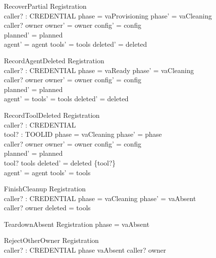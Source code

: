\documentclass[a4paper,10pt,fleqn]{article}
\begin{document}
\begin{schema}{RecoverPartial}
  \Delta Registration \\
  caller? : CREDENTIAL
\where
  phase = vaProvisioning \land phase' = vaCleaning \\
  caller? \in owner \land owner' = owner \land config' = config \\
  planned' = planned \\
  agent' = agent \land tools' = tools \land deleted' = deleted
\end{schema}

\begin{schema}{RecordAgentDeleted}
  \Delta Registration \\
  caller? : CREDENTIAL
\where
  phase = vaReady \land phase' = vaCleaning \\
  caller? \in owner \land owner' = owner \land config' = config \\
  planned' = planned \\
  agent' = \emptyset \land tools' = tools \land deleted' = deleted
\end{schema}

\begin{schema}{RecordToolDeleted}
  \Delta Registration \\
  caller? : CREDENTIAL \\
  tool? : TOOLID
\where
  phase = vaCleaning \land phase' = phase \\
  caller? \in owner \land owner' = owner \land config' = config \\
  planned' = planned \\
  tool? \in \ran tools \land deleted' = deleted \cup \{tool?\} \\
  agent' = agent \land tools' = tools
\end{schema}

\begin{schema}{FinishCleanup}
  \Delta Registration \\
  caller? : CREDENTIAL
\where
  phase = vaCleaning \land phase' = vaAbsent \\
  caller? \in owner \land deleted = \ran tools
\end{schema}

\begin{schema}{TeardownAbsent}
  \Xi Registration
\where
  phase = vaAbsent
\end{schema}

\begin{schema}{RejectOtherOwner}
  \Xi Registration \\
  caller? : CREDENTIAL
\where
  phase \neq vaAbsent \land caller? \notin owner
\end{schema}
\end{document}
